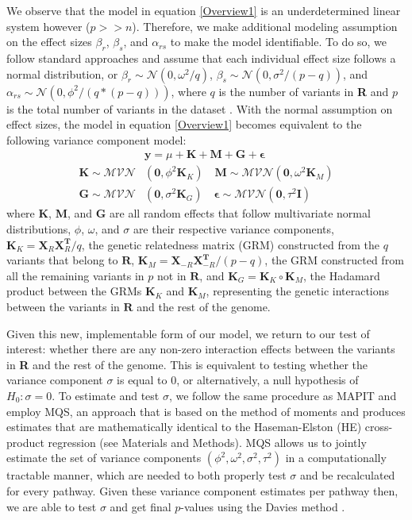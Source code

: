 \documentclass[12pt,a4paper]{article}
\begin{document}
We observe that the model in equation \ref{Overview1} is an underdetermined linear system however ($p >> n$). Therefore, we make additional modeling assumption on the effect sizes $\beta_r$, $\beta_s$, and $\alpha_{rs}$ to make the model identifiable. To do so, we follow standard approaches \citep{Wu2011,Zhou2013,Yang2010} and assume that each individual effect size follows a normal distribution, or $\beta_r \sim \mathcal{N}(0, \omega^2/q)$, $\beta_s \sim \mathcal{N}(0, \sigma^2/(p-q))$, and $\alpha_{rs} \sim \mathcal{N}(0, \phi^2/(q*(p-q)))$, where $q$ is the number of variants in \textbf{R} and $p$ is the total number of variants in the dataset \citep{Crawford2017a}. With the normal assumption on effect sizes, the model in equation \ref{Overview1} becomes equivalent to the following variance component model:
\begin{align}\label{Overview2}
    & \textbf{y} = \mu + \textbf{K} + \textbf{M} + \textbf{G} + \boldsymbol{\epsilon} \\
    \textbf{K} \sim \mathcal{MVN}&(\textbf{0}, \phi^{2}\textbf{K}_K) \quad \textbf{M} \sim \mathcal{MVN}(\textbf{0}, \omega^{2}\textbf{K}_M) \nonumber \\ 
    \textbf{G} \sim \mathcal{MVN}&(\textbf{0}, \sigma^{2}\textbf{K}_G) \quad \boldsymbol{\epsilon} \sim \mathcal{MVN}(\textbf{0}, \tau^{2}\textbf{I}) \nonumber 
\end{align}
where \textbf{K}, \textbf{M}, and \textbf{G} are all random effects that follow multivariate normal distributions, $\phi$, $\omega$, and $\sigma$ are their respective variance components, $\textbf{K}_K = \textbf{X}_{R}\textbf{X}^{\textbf{T}}_{R}/q$, the genetic relatedness matrix (GRM) constructed from the $q$ variants that belong to $\textbf{R}$, $\textbf{K}_M = \textbf{X}_{-R}\textbf{X}^{\textbf{T}}_{-R}/(p-q)$, the GRM constructed from all the remaining variants in $p$ not in $\textbf{R}$, and $\textbf{K}_G = \textbf{K}_K \circ \textbf{K}_M$, the Hadamard product between the GRMs $\textbf{K}_K$ and $\textbf{K}_M$, representing the genetic interactions between the variants in $\textbf{R}$ and the rest of the genome.

Given this new, implementable form of our model, we return to our test of interest: whether there are any non-zero interaction effects between the variants in \textbf{R} and the rest of the genome. This is equivalent to testing whether the variance component $\sigma$ is equal to 0, or alternatively, a null hypothesis of $H_0: \sigma = 0$. To estimate and test $\sigma$, we follow the same procedure as MAPIT and employ MQS, an approach that is based on the method of moments and produces estimates that are mathematically identical to the Haseman-Elston (HE) cross-product regression \citep{Haseman1972, Zhou2017} (see Materials and Methods). MQS allows us to jointly estimate the set of variance components $(\phi^{2}, \omega^{2}, \sigma^{2}, \tau^{2})$ in a computationally tractable manner, which are needed to both properly test $\sigma$ and be recalculated for every pathway. Given these variance component estimates per pathway then, we are able to test $\sigma$ and get final $p$-values using the Davies method \citep{Crawford2017a,Davies1980}.  
\end{document}
